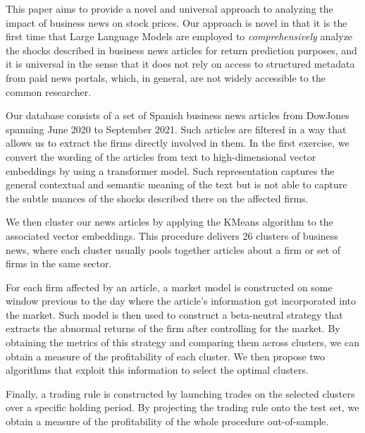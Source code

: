 


\hspace{0.5cm} This paper aims to provide a novel and universal approach to analyzing the impact of business news on stock prices. Our approach is novel in that it is the first time that Large Language Models are employed to \textit{comprehensively} analyze the shocks described in business news articles for return prediction purposes, and it is universal in the sense that it does not rely on access to structured metadata from paid news portals, which, in general, are not widely accessible to the common researcher.

\mx 
Our database consists of a set of Spanish business news articles from DowJones spanning June 2020 to September 2021. Such articles are filtered in a way that allows us to extract the firms directly involved in them. In the first exercise, we convert the wording of the articles from text to high-dimensional vector embeddings by using a transformer model. Such representation captures the general contextual and semantic meaning of the text but is not able to capture the subtle nuances of the shocks described there on the affected firms. 

\mx 
We then cluster our news articles by applying the KMeans algorithm to the associated vector embeddings. This procedure delivers 26 clusters of business news, where each cluster usually pools together articles about a firm or set of firms in the same sector. 

\mx 
For each firm affected by an article, a market model is constructed on some window previous to the day where the article's information got incorporated into the market. Such model is then used to construct a beta-neutral strategy that extracts the abnormal returns of the firm after controlling for the market. 
By obtaining the metrics of this strategy and comparing them across clusters, we can obtain a measure of the profitability of each cluster. We then propose two algorithms that exploit this information to select the optimal clusters.

\mx 
Finally, a trading rule is constructed by launching trades on the selected clusters over a specific holding period. By projecting the trading rule onto the test set, we obtain a measure of the profitability of the whole procedure out-of-sample. 

